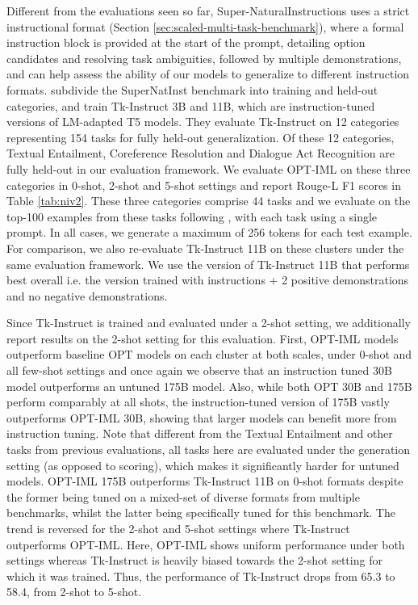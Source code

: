 Different from the evaluations seen so far, Super-NaturalInstructions uses a strict instructional format (Section \ref{sec:scaled-multi-task-benchmark}), where a formal instruction block is provided at the start of the prompt, detailing option candidates and resolving task ambiguities, followed by multiple demonstrations, and can help assess the ability of our models to generalize to different instruction formats. \cite{wang2022niv2} subdivide the SuperNatInst benchmark into training and held-out categories, and train Tk-Instruct 3B and 11B, which are instruction-tuned versions of LM-adapted T5 models. They evaluate Tk-Instruct on 12 categories representing 154 tasks for fully held-out generalization. Of these 12 categories, Textual Entailment, Coreference Resolution and Dialogue Act Recognition are fully held-out in our evaluation framework. We evaluate OPT-IML on these three categories in 0-shot, 2-shot and 5-shot settings and report Rouge-L F1 scores in Table \ref{tab:niv2}. These three categories comprise 44 tasks and we evaluate on the top-100 examples from these tasks following \cite{wang2022niv2}, with each task using a single prompt. In all cases, we generate a maximum of 256 tokens for each test example. For comparison, we also re-evaluate Tk-Instruct 11B on these clusters under the same evaluation framework. We use the version of Tk-Instruct 11B that performs best overall i.e. the version trained with instructions + 2 positive demonstrations and no negative demonstrations. 

Since Tk-Instruct is trained and evaluated under a 2-shot setting, we additionally report results on the 2-shot setting for this evaluation. First, OPT-IML models outperform baseline OPT models on each cluster at both scales, under 0-shot and all few-shot settings and once again we observe that an instruction tuned 30B model outperforms an untuned 175B model. Also, while both OPT 30B and 175B perform comparably at all shots, the instruction-tuned version of 175B vastly outperforms OPT-IML 30B, showing that larger models can benefit more from instruction tuning. Note that different from the Textual Entailment and other tasks from previous evaluations, all tasks here are evaluated under the generation setting (as opposed to scoring), which makes it significantly harder for untuned models. OPT-IML 175B outperforms Tk-Instruct 11B on 0-shot formats despite the former being tuned on a mixed-set of diverse formats from multiple benchmarks, whilst the latter being specifically tuned for this benchmark. The trend is reversed for the 2-shot and 5-shot settings where Tk-Instruct outperforms OPT-IML. Here, OPT-IML shows uniform performance under both settings whereas Tk-Instruct is heavily biased towards the 2-shot setting for which it was trained. Thus, the performance of Tk-Instruct drops from 65.3 to 58.4, from 2-shot to 5-shot. 

